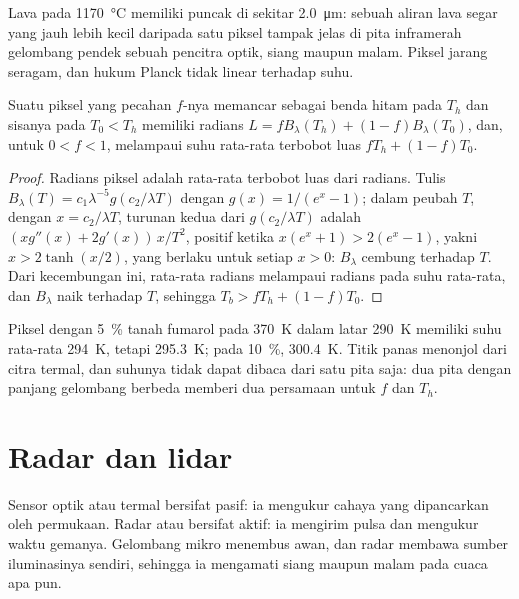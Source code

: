 Lava pada \qty{1170}{\celsius} memiliki puncak di sekitar \qty{2.0}{\micro\metre}: sebuah
aliran lava segar yang jauh lebih kecil daripada satu piksel tampak jelas di
pita inframerah gelombang pendek sebuah pencitra optik, siang maupun malam. Piksel jarang seragam, dan
hukum Planck tidak linear terhadap suhu.

\begin{proposition}\label{prop:b3:remote-sensing-gis:mixed}
Suatu piksel yang pecahan $f$-nya memancar sebagai benda hitam pada $T_h$ dan sisanya
pada $T_0 < T_h$ memiliki radians $L = fB_\lambda(T_h) + (1 - f)B_\lambda(T_0)$,
dan, untuk $0 < f < 1$,  melampaui
suhu rata-rata terbobot luas $fT_h + (1 - f)T_0$.
\end{proposition}

\begin{proof}
Radians piksel adalah rata-rata terbobot luas dari radians. Tulis $B_\lambda(T)
= c_1\lambda^{-5}g(c_2/\lambda T)$ dengan $g(x) = 1/(e^x - 1)$; dalam
peubah $T$, dengan $x = c_2/\lambda T$, turunan kedua dari
$g(c_2/\lambda T)$ adalah $(x g''(x) + 2g'(x))\,x/T^2$, positif ketika $x(e^x + 1)
> 2(e^x - 1)$, yakni $x > 2\tanh(x/2)$, yang berlaku untuk setiap $x > 0$:
$B_\lambda$ cembung terhadap $T$. Dari kecembungan ini,
rata-rata radians melampaui radians pada suhu rata-rata, dan
$B_\lambda$ naik terhadap $T$, sehingga $T_b > fT_h + (1 - f)T_0$.
\end{proof}

Piksel dengan \qty{5}{\percent} tanah fumarol
pada \qty{370}{K} dalam latar \qty{290}{K} memiliki suhu rata-rata
\qty{294}{K}, tetapi  \qty{295.3}{K};
pada \qty{10}{\percent}, \qty{300.4}{K}. Titik panas menonjol dari
citra termal, dan suhunya tidak dapat dibaca dari satu pita saja: dua pita
dengan panjang gelombang berbeda memberi dua persamaan untuk $f$ dan $T_h$.

\section{Radar dan lidar}\label{sec:b3:remote-sensing-gis:radar}

Sensor optik atau termal bersifat pasif: ia mengukur cahaya yang dipancarkan oleh
permukaan. Radar atau  bersifat aktif: ia mengirim pulsa dan mengukur
waktu gemanya. Gelombang mikro menembus awan, dan radar membawa sumber iluminasinya sendiri,
sehingga ia mengamati siang maupun malam pada cuaca apa pun.


